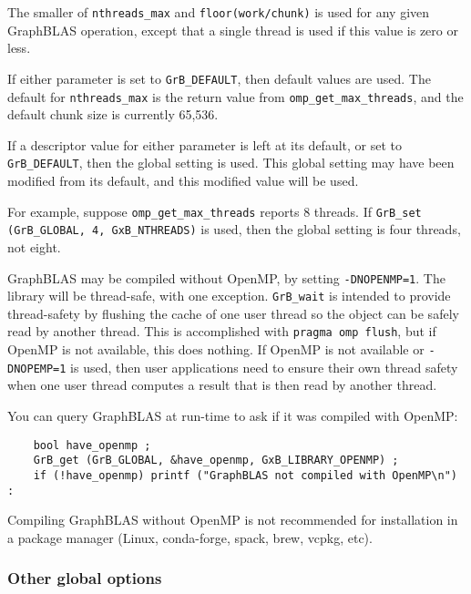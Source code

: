 The smaller of \verb'nthreads_max' and \verb'floor(work/chunk)' is used for any
given GraphBLAS operation, except that a single thread is used if this value is
zero or less.

If either parameter is set to \verb'GrB_DEFAULT', then default values are used.
The default for \verb'nthreads_max' is the return value from
\verb'omp_get_max_threads', and the default chunk size is currently 65,536.

If a descriptor value for either parameter is left at its default, or set to
\verb'GrB_DEFAULT', then the global setting is used.  This global setting may
have been modified from its default, and this modified value will be used.

For example, suppose \verb'omp_get_max_threads' reports 8 threads.  If \newline
\verb'GrB_set (GrB_GLOBAL, 4, GxB_NTHREADS)' is used, then the global setting is four
threads, not eight.

GraphBLAS may be compiled without OpenMP, by setting \verb'-DNOPENMP=1'.
The library will be thread-safe, with one exception.  \verb'GrB_wait' is
intended to provide thread-safety by flushing the cache of one user thread
so the object can be safely read by another thread.  This is accomplished
with \verb'pragma omp flush', but if OpenMP is not available, this does
nothing.  If OpenMP is not available or \verb'-DNOPEMP=1' is used, then
user applications need to ensure their own thread safety when one user thread
computes a result that is then read by another thread.

You can query GraphBLAS at run-time to ask if it was compiled with OpenMP:

\begin{verbatim}
    bool have_openmp ;
    GrB_get (GrB_GLOBAL, &have_openmp, GxB_LIBRARY_OPENMP) ;
    if (!have_openmp) printf ("GraphBLAS not compiled with OpenMP\n") :
\end{verbatim}

Compiling GraphBLAS without OpenMP is not recommended for installation in a
package manager (Linux, conda-forge, spack, brew, vcpkg, etc).

\subsubsection{Other global options}

